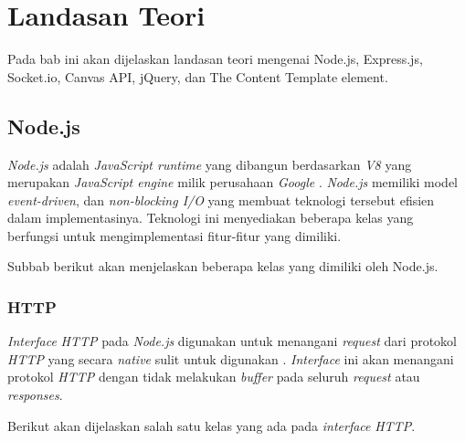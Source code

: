 \chapter{Landasan Teori}
\label{chap:teori}

Pada bab ini akan dijelaskan landasan teori mengenai Node.js, Express.js, Socket.io, Canvas API, jQuery, dan The Content Template element.

\section{Node.js}
\label{sec:Node.js}

\textit{Node.js} adalah \textit{JavaScript runtime} yang dibangun berdasarkan \textit{V8} yang merupakan \textit{JavaScript engine} milik perusahaan \textit{Google} \cite{dahl:09:nodejsdocs}. \textit{Node.js} memiliki model \textit{event-driven}, dan \textit{non-blocking I/O} yang membuat teknologi tersebut efisien dalam implementasinya. Teknologi ini menyediakan beberapa kelas yang berfungsi untuk mengimplementasi fitur-fitur yang dimiliki.

Subbab berikut akan menjelaskan beberapa kelas yang dimiliki oleh Node.js.

\subsection{HTTP}
\textit{Interface} \textit{HTTP} pada \textit{Node.js} digunakan untuk menangani \textit{request} dari protokol \textit{HTTP} yang secara \textit{native} sulit untuk digunakan \cite{dahl:09:nodejsdocs}. \textit{Interface} ini akan menangani protokol \textit{HTTP} dengan tidak melakukan \textit{buffer} pada seluruh \textit{request} atau \textit{responses}.

Berikut akan dijelaskan salah satu kelas yang ada pada \textit{interface} \textit{HTTP}.

